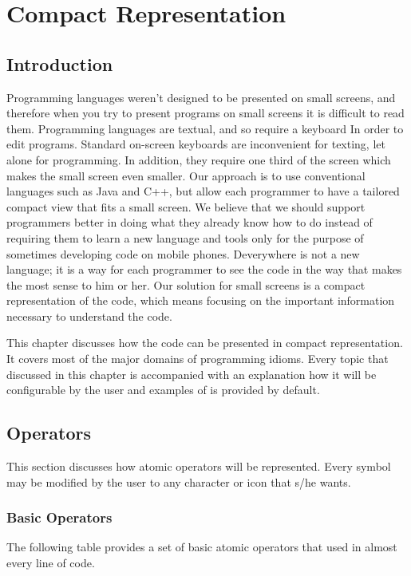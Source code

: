 \chapter{Compact Representation}
\section{Introduction}
Programming languages weren't designed to be presented on small screens, and therefore when you try to present programs on small screens it is difficult to read them. Programming languages are textual, and so require a keyboard In order to edit programs. Standard on-screen keyboards are inconvenient for texting, let alone for programming. In addition, they require one third of the screen which makes the small screen even smaller. Our approach is to use conventional languages such as Java and C++, but allow each programmer to have a tailored compact view that fits a small screen. We believe that we should support programmers better in doing what they already know how to do instead of requiring them to learn a new language and tools only for the purpose of sometimes developing code on mobile phones. Deverywhere is not a new language; it is a way for each programmer to see the code in the way that makes the most sense to him or her. Our solution for small screens is a compact representation of the code, which means focusing on the important information necessary to understand the code. 

This chapter discusses how the code can be presented in compact representation. It covers most of the major domains of programming idioms. Every topic that discussed in this chapter is accompanied with an explanation how it will be configurable by the user and examples of is provided by default.
\section{Operators}
This section discusses how atomic operators will be represented. Every symbol may be modified by the user to any character or icon that s/he wants.
\subsection{Basic Operators}
The following table provides a set of basic atomic operators that used in almost every line of code.

